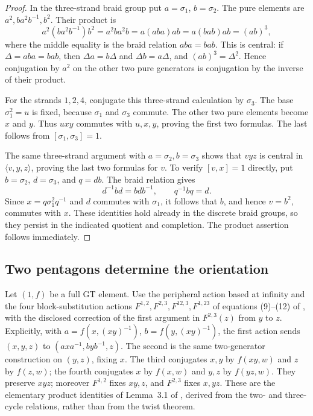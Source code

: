 \begin{proof}
In the three-strand braid group put \(a=\sigma_1\),
\(b=\sigma_2\). The pure elements are
\(a^2,ba^2b^{-1},b^2\). Their product is
\[
 a^2(ba^2b^{-1})b^2=a^2ba^2b
      =a(aba)ab=a(bab)ab=(ab)^3,
\]
where the middle equality is the braid relation \(aba=bab\).
This is central: if \(\Delta=aba=bab\), then
\(\Delta a=b\Delta\) and \(\Delta b=a\Delta\), and
\((ab)^3=\Delta^2\). Hence conjugation by \(a^2\) on the
other two pure generators is conjugation by the inverse of their
product.

For the strands \(1,2,4\), conjugate this three-strand calculation
by \(\sigma_3\). The base \(\sigma_1^2=u\) is fixed,
because \(\sigma_1\) and \(\sigma_3\) commute. The other two
pure elements become \(x\) and \(y\). Thus \(uxy\) commutes
with \(u,x,y\), proving the first two formulas. The last follows
from \([\sigma_1,\sigma_3]=1\).

The same three-strand argument with \(a=\sigma_2,b=\sigma_3\)
shows that \(vyz\) is central in \(\langle v,y,z\rangle\),
proving the last two formulas for \(v\). To verify \([v,x]=1\)
directly, put \(b=\sigma_2\), \(d=\sigma_3\), and
\(q=db\). The braid relation gives
\[
 d^{-1}bd=bdb^{-1},\qquad q^{-1}bq=d.
\]
Since \(x=q\sigma_1^2q^{-1}\) and \(d\) commutes with
\(\sigma_1\), it follows that \(b\), and hence \(v=b^2\),
commutes with \(x\). These identities hold already in the
discrete braid groups, so they persist in the indicated quotient
and completion. The product assertion follows immediately.
\end{proof}

\subsection{Two pentagons determine the orientation}

Let \((1,f)\) be a full GT element. Use the peripheral action
based at infinity and the four block-substitution actions
\(F^{1,2},F^{2,3},F^{12,3},F^{1,23}\) of equations
(9)--(12) of \cite{LS2015Twists}, with the disclosed correction of the first
argument in \(F^{2,3}(z)\) from \(y\) to \(z\).
Explicitly, with \(a=f(x,(xy)^{-1})\),
\(b=f(y,(xy)^{-1})\), the first action sends
\((x,y,z)\) to \((axa^{-1},byb^{-1},z)\). The second
is the same two-generator construction on \((y,z)\), fixing
\(x\). The third conjugates \(x,y\) by \(f(xy,w)\)
and \(z\) by \(f(z,w)\); the fourth conjugates \(x\)
by \(f(x,w)\) and \(y,z\) by \(f(yz,w)\).
They preserve \(xyz\); moreover \(F^{1,2}\) fixes \(xy,z\),
and \(F^{2,3}\) fixes \(x,yz\). These are the elementary
product identities of Lemma~3.1 of \cite{LS2015Twists}, derived from the two- and
three-cycle relations, rather than from the twist theorem.

